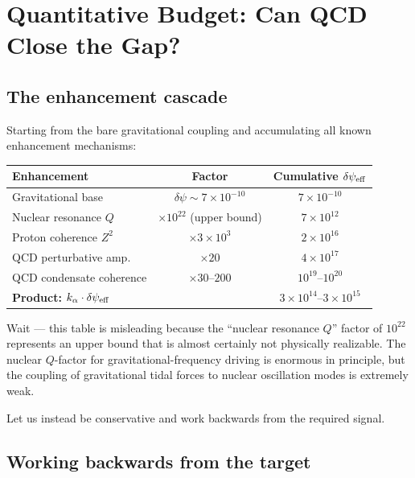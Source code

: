 \documentclass[aps,prd,twocolumn,superscriptaddress,floatfix,nofootinbib]{revtex4-2}
\begin{document}
\section{Quantitative Budget: Can QCD Close the Gap?}
\label{sec:budget}

\subsection{The enhancement cascade}

Starting from the bare gravitational coupling and accumulating all known
enhancement mechanisms:

\begin{center}
\begin{tabular}{lcc}
\toprule
\textbf{Enhancement} & \textbf{Factor} & \textbf{Cumulative $\delta\psi_{\rm eff}$} \\
\midrule
Gravitational base & $\delta\psi \sim 7 \times 10^{-10}$ & $7 \times 10^{-10}$ \\
Nuclear resonance $Q$ & $\times 10^{22}$ (upper bound) & $7 \times 10^{12}$ \\
Proton coherence $Z^2$ & $\times 3 \times 10^{3}$ & $2 \times 10^{16}$ \\
QCD perturbative amp. & $\times 20$ & $4 \times 10^{17}$ \\
QCD condensate coherence & $\times 30$--$200$ & $10^{19}$--$10^{20}$ \\
\midrule
\textbf{Product:} $k_\alpha \cdot \delta\psi_{\rm eff}$ & & $3 \times 10^{14}$--$3 \times 10^{15}$ \\
\bottomrule
\end{tabular}
\end{center}

Wait --- this table is misleading because the ``nuclear resonance $Q$'' factor
of $10^{22}$ represents an upper bound that is almost certainly not physically
realizable. The nuclear $Q$-factor for gravitational-frequency driving is
enormous in principle, but the coupling of gravitational tidal forces to nuclear
oscillation modes is extremely weak.

Let us instead be conservative and work backwards from the required signal.

\subsection{Working backwards from the target}
\end{document}
